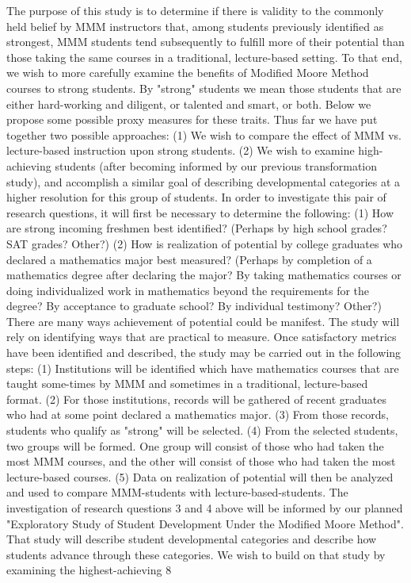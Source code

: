 \documentclass[11pt]{article}
\begin{document}
The purpose of this study is to determine if there is validity to the commonly held belief by MMM instructors that, among students previously identified as strongest, MMM students tend subsequently to fulfill more of their potential than those taking the same courses in a traditional, lecture-based setting. To that end, we wish to more carefully examine the benefits of Modified Moore Method courses to strong students. By "strong" students we mean those students that are either hard-working and diligent, or talented and smart, or both. Below we propose some possible proxy measures for these traits. Thus far we have put together two possible approaches: (1) We wish to compare the effect of MMM vs. lecture-based instruction upon strong students. (2) We wish to examine high-achieving students (after becoming informed by our previous transformation study), and accomplish a similar goal of describing developmental categories at a higher resolution for this group of students. In order to investigate this pair of research questions, it will first be necessary to determine the following: (1) How are strong incoming freshmen best identified? (Perhaps by high school grades? SAT grades? Other?) (2) How is realization of potential by college graduates who declared a mathematics major best measured? (Perhaps by completion of a mathematics degree after declaring the major? By taking mathematics courses or doing individualized work in mathematics beyond the requirements for the degree? By acceptance to graduate school? By individual testimony? Other?) There are many ways achievement of potential could be manifest. The study will rely on identifying ways that are practical to measure. Once satisfactory metrics have been identified and described, the study may be carried out in the following steps: (1) Institutions will be identified which have mathematics courses that are taught some-times by MMM and sometimes in a traditional, lecture-based format. (2) For those institutions, records will be gathered of recent graduates who had at some point declared a mathematics major. (3) From those records, students who qualify as "strong" will be selected. (4) From the selected students, two groups will be formed. One group will consist of those who had taken the most MMM courses, and the other will consist of those who had taken the most lecture-based courses. (5) Data on realization of potential will then be analyzed and used to compare MMM-students with lecture-based-students. The investigation of research questions 3 and 4 above will be informed by our planned "Exploratory Study of Student Development Under the Modified Moore Method". That study will describe student developmental categories and describe how students advance through these categories. We wish to build on that study by examining the highest-achieving 8
\end{document}
